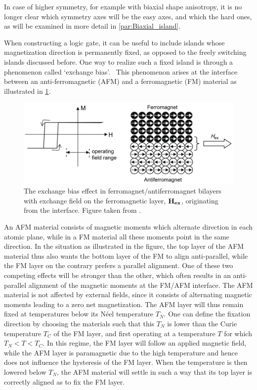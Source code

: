 \documentclass[11pt,a4paper,english]{article}
\begin{document}
In case of higher symmetry, for example with biaxial shape anisotropy, it is no longer clear which symmetry axes will be the easy axes, and which the hard ones, as will be examined in more detail in \cref{par:Biaxial_island}.  \par
When constructing a logic gate, it can be useful to include islands whose magnetization direction is permanently fixed, as opposed to the freely switching islands discussed before. One way to realize such a fixed island is through a phenomenon called `exchange bias'.~\cite{ExchangeBias_Mechanisms,ExchangeBias_nanostructures,ExchangeBias,syllabus_PoAEaPD} This phenomenon arises at the interface between an anti-ferromagnetic (AFM) and a ferromagnetic (FM) material as illustrated in \cref{fig:Intro_ExchangeBias}.
\begin{figure}[t]
    \centering
    \includegraphics[width=0.8\columnwidth]{Figures/Introduction/Syallabus_PoAEaPD - Figure 2.7.png}
    \caption{The exchange bias effect in ferromagnet/antiferromagnet bilayers with exchange field on the ferromagnetic layer, $\vb{H_{ex}}$, originating from the interface. Figure taken from \cite{syllabus_PoAEaPD}.}
    \label{fig:Intro_ExchangeBias}
\end{figure}
An AFM material consists of magnetic moments which alternate direction in each atomic plane, while in a FM material all these moments point in the same direction. In the situation as illustrated in the figure, the top layer of the AFM material thus also wants the bottom layer of the FM to align anti-parallel, while the FM layer on the contrary prefers a parallel alignment. One of these two competing effects will be stronger than the other, which often results in an anti-parallel alignment of the magnetic moments at the FM/AFM interface. The AFM material is not affected by external fields, since it consists of alternating magnetic moments leading to a zero net magnetization. The AFM layer will thus remain fixed at temperatures below its N\'{e}el temperature $T_N$. One can define the fixation direction by choosing the materials such that this $T_N$ is lower than the Curie temperature $T_C$ of the FM layer, and first operating at a temperature $T$ for which $T_N < T < T_C$. In this regime, the FM layer will follow an applied magnetic field, while the AFM layer is paramagnetic due to the high temperature and hence does not influence the hysteresis of the FM layer. When the temperature is then lowered below $T_N$, the AFM material will settle in such a way that its top layer is correctly aligned as to fix the FM layer.~\cite{ExchangeBias_Mechanisms} \par
\end{document}
